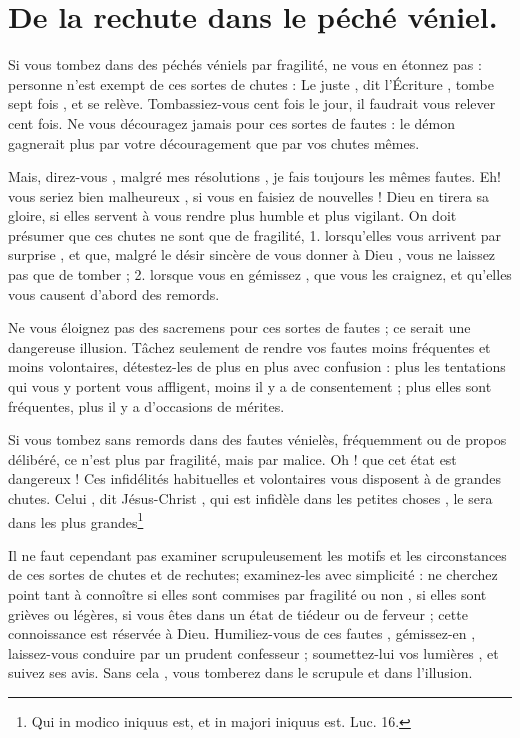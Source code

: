 \documentclass[instructions.tex]{subfiles}
\begin{document}
 
\chapter{De la rechute dans le péché véniel.}
 
\primo Si vous tombez dans des péchés véniels par fragilité, ne vous en étonnez pas : personne n’est exempt de ces sortes de chutes : Le juste , dit l’Écriture , tombe sept fois , et se relève. Tombassiez-vous cent fois le jour, il faudrait vous relever cent fois. Ne vous découragez jamais pour ces sortes de fautes : le démon gagnerait plus par votre découragement que par vos chutes mêmes.
 
Mais, direz-vous , malgré mes résolutions , je fais toujours les mêmes fautes. Eh! vous seriez bien malheureux , si vous en faisiez de nouvelles ! Dieu en tirera sa gloire, si elles servent à vous rendre plus humble et plus vigilant. On doit présumer que ces chutes ne sont que de fragilité, 1. lorsqu’elles vous arrivent par surprise , et que, malgré le désir sincère de vous donner à Dieu , vous ne laissez pas que de tomber ; 2. lorsque vous en gémissez , que vous les craignez, et qu’elles vous causent d’abord des remords.
 
Ne vous éloignez pas des sacremens pour ces sortes de fautes ; ce serait une dangereuse illusion. Tâchez seulement de rendre vos fautes moins fréquentes et moins volontaires, détestez-les de plus en plus avec confusion : plus les tentations qui vous y portent vous affligent, moins il y a de consentement ; plus elles sont fréquentes, plus il y a d’occasions de mérites.
 
\secundo Si vous tombez sans remords dans des fautes vénielès, fréquemment ou de propos délibéré, ce n’est plus par fragilité, mais par malice. Oh ! que cet état est dangereux ! Ces infidélités habituelles et volontaires vous disposent à de grandes chutes. Celui , dit Jésus-Christ , qui est infidèle dans les petites choses , le sera dans les plus grandes\footnote{Qui in modico iniquus est, et in majori iniquus est. Luc. 16.}
 
Il ne faut cependant pas examiner scrupuleusement les motifs et les circonstances de ces sortes de chutes et de rechutes; examinez-les avec simplicité : ne cherchez point tant à connoître si elles sont commises par fragilité ou non , si elles sont grièves ou légères, si vous êtes dans un état de tiédeur ou de ferveur ; cette connoissance est réservée à Dieu. Humiliez-vous de ces fautes , gémissez-en , laissez-vous conduire par un prudent confesseur ; soumettez-lui vos lumières , et suivez ses avis. Sans cela , vous tomberez dans le scrupule et dans l’illusion.
 
\end{document}
